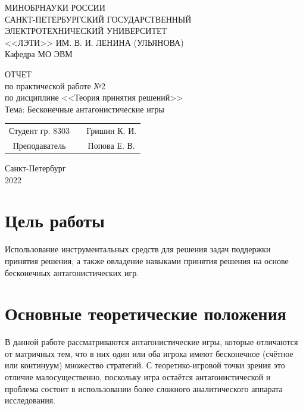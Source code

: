 \documentclass[12pt,a4paper]{article}
\begin{document}
\begin{titlepage}
  \begin{center}
    МИНОБРНАУКИ РОССИИ\\
    САНКТ-ПЕТЕРБУРГСКИЙ ГОСУДАРСТВЕННЫЙ\\
    ЭЛЕКТРОТЕХНИЧЕСКИЙ УНИВЕРСИТЕТ\\
    <<ЛЭТИ>> ИМ. В. И. ЛЕНИНА (УЛЬЯНОВА)\\
    Кафедра МО ЭВМ

    \vspace{4cm}

    ОТЧЕТ\\
    по практической работе №2\\
    по дисциплине <<Теория принятия решений>>\\
    Тема: Бесконечные антагонистические игры
    \vfill

    \begin{tabular}{ c c c }
      Студент гр. 8303 & \uline{\hspace{3cm}} & Гришин К. И. \\[1cm]
      Преподаватель    & \uline{\hspace{3cm}} & Попова Е. В. \\
    \end{tabular}
    
    \vfill
    Санкт-Петербург\\
    2022
  \end{center}
\end{titlepage}


\section{Цель работы}
Использование инструментальных средств для решения задач поддержки
принятия решения, а также овладение навыками принятия решения на основе
бесконечных антагонистических игр.

\section{Основные теоретические положения}
В данной работе рассматриваются антагонистические игры, которые
отличаются от матричных тем, что в них один или оба игрока имеют
бесконечное (счётное или континуум) множество стратегий.
С теоретико-игровой точки зрения это отличие малосущественно, поскольку игра
остаётся антагонистической и проблема состоит в использовании более
сложного аналитического аппарата исследования.
\end{document}
